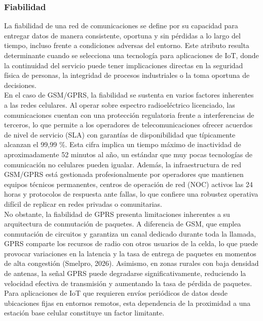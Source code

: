 \documentclass[12pt,a4paper]{article}
\begin{document}
	\subsubsection{Fiabilidad}

	La fiabilidad de una red de comunicaciones se define por su capacidad para entregar datos de manera consistente, oportuna y sin pérdidas a lo largo del tiempo, incluso frente a condiciones adversas del entorno. Este atributo resulta determinante cuando se selecciona una tecnología para aplicaciones de IoT, donde la continuidad del servicio puede tener implicaciones directas en la seguridad física de personas, la integridad de procesos industriales o la toma oportuna de decisiones.\\

	En el caso de GSM/GPRS, la fiabilidad se sustenta en varios factores inherentes a las redes celulares. Al operar sobre espectro radioeléctrico licenciado, las comunicaciones cuentan con una protección regulatoria frente a interferencias de terceros, lo que permite a los operadores de telecomunicaciones ofrecer acuerdos de nivel de servicio (SLA) con garantías de disponibilidad que típicamente alcanzan el 99,99 \%. Esta cifra implica un tiempo máximo de inactividad de aproximadamente 52 minutos al año, un estándar que muy pocas tecnologías de comunicación no celulares pueden igualar. Además, la infraestructura de red GSM/GPRS está gestionada profesionalmente por operadores que mantienen equipos técnicos permanentes, centros de operación de red (NOC) activos las 24 horas y protocolos de respuesta ante fallas, lo que confiere una robustez operativa difícil de replicar en redes privadas o comunitarias.\\
	
	No obstante, la fiabilidad de GPRS presenta limitaciones inherentes a su arquitectura de conmutación de paquetes. A diferencia de GSM, que emplea conmutación de circuitos y garantiza un canal dedicado durante toda la llamada, GPRS comparte los recursos de radio con otros usuarios de la celda, lo que puede provocar variaciones en la latencia y la tasa de entrega de paquetes en momentos de alta congestión (Smelpro, 2026). Asimismo, en zonas rurales con baja densidad de antenas, la señal GPRS puede degradarse significativamente, reduciendo la velocidad efectiva de transmisión y aumentando la tasa de pérdida de paquetes. Para aplicaciones de IoT que requieren envíos periódicos de datos desde ubicaciones fijas en entornos remotos, esta dependencia de la proximidad a una estación base celular constituye un factor limitante.\\
\end{document}
